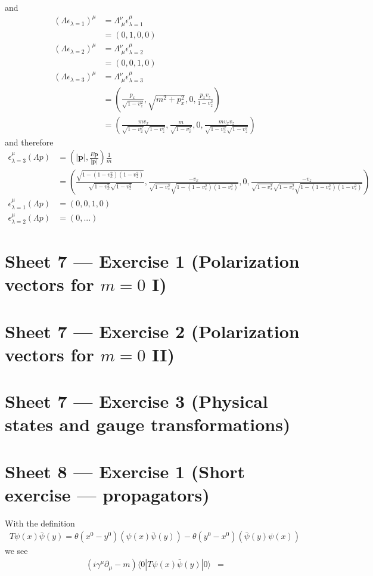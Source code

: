 \documentclass[10pt,a4paper]{report}
\theoremstyle{definition}
\begin{document}
and
\begin{align}
(\Lambda \epsilon_{\lambda=1})^\mu
&=\Lambda^\nu_{\;\mu} \epsilon^\mu_{\lambda=1}\\
&=\left(0,1,0,0\right)\\
(\Lambda \epsilon_{\lambda=2})^\mu
&=\Lambda^\nu_{\;\mu} \epsilon^\mu_{\lambda=2}\\
&=\left(0,0,1,0\right)\\
(\Lambda \epsilon_{\lambda=3})^\mu
&=\Lambda^\nu_{\;\mu} \epsilon^\mu_{\lambda=3}\\
&=\left(\frac{p_x}{\sqrt{1-v_z^2}},\sqrt{m^2+p_x^2},0,\frac{p_xv_z}{1-v_z^2}\right)\\
&=\left(\frac{m v_x}{\sqrt{1-v_x^2}\sqrt{1-v_z^2}},\frac{m}{\sqrt{1-v_x^2}},0,\frac{mv_xv_z}{\sqrt{1-v_x^2}\sqrt{1-v_z^2}}\right)
\end{align}
and therefore
\begin{align}
\epsilon_{\lambda=3}^\mu(\Lambda p)
&=\left(|\mathbf{p}|,\frac{E\mathbf{p}}{|\mathbf{p}|}\right)\frac{1}{m}\\
&=(\frac{
\sqrt{1-(1-v_x^2)(1-v_z^2)}}{\sqrt{1-v_x^2}\sqrt{1-v_z^2}},
\frac{-v_x}{\sqrt{1-v_x^2}\sqrt{1-(1-v_x^2)(1-v_z^2)}},
0,
\frac{-v_z}{\sqrt{1-v_x^2}\sqrt{1-v_z^2}\sqrt{1-(1-v_x^2)(1-v_z^2)}})\\
\epsilon_{\lambda=1}^\mu(\Lambda p)&=(0,0,1,0)\\
\epsilon_{\lambda=2}^\mu(\Lambda p)&=(0,...)
\end{align}



\newpage
\section{Sheet 7 — Exercise 1 (Polarization vectors for $m=0$ I)}
\section{Sheet 7 — Exercise 2 (Polarization vectors for $m=0$ II)}
\section{Sheet 7 — Exercise 3 (Physical states and gauge transformations)}




\newpage
\section{Sheet 8 — Exercise 1 (Short exercise — propagators)}
With the definition
\begin{align}
T\psi(x)\bar{\psi}(y)=\theta(x^0-y^0)(\psi(x)\bar{\psi}(y))-\theta(y^0-x^0)(\bar{\psi}(y)\psi(x))
\end{align}
we see
\begin{align}
(i\gamma^\mu\partial_\mu-m)\langle0|T\psi(x)\bar{\psi}(y)|0\rangle
&=
\end{align}
\end{document}
